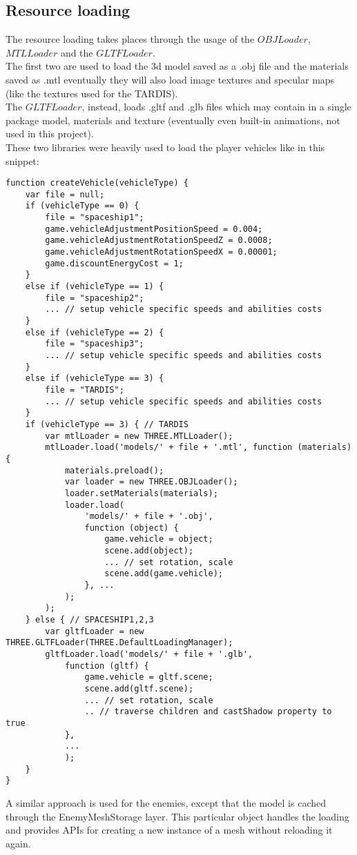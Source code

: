 \documentclass[a4paper,11pt]{article}
\begin{document}
\subsection{Resource loading}
The resource loading takes places through the usage of the $OBJLoader$, $MTLLoader$ and the $GLTFLoader$.\\
The first two are used to load the 3d model saved as a .obj file and the materials saved as .mtl eventually they will also load image textures and specular maps (like the textures used for the TARDIS).\\
The $GLTFLoader$, instead, loads .gltf and .glb files which may contain in a single package model, materials and texture (eventually even built-in animations, not used in this project).\\
These two libraries were heavily used to load  the player vehicles like in this snippet:
\begin{verbatim}
function createVehicle(vehicleType) {
    var file = null;
    if (vehicleType == 0) {
        file = "spaceship1";
        game.vehicleAdjustmentPositionSpeed = 0.004;
        game.vehicleAdjustmentRotationSpeedZ = 0.0008;
        game.vehicleAdjustmentRotationSpeedX = 0.00001;
        game.discountEnergyCost = 1;
    }
    else if (vehicleType == 1) {
        file = "spaceship2";
        ... // setup vehicle specific speeds and abilities costs
    }
    else if (vehicleType == 2) {
        file = "spaceship3";
        ... // setup vehicle specific speeds and abilities costs
    }
    else if (vehicleType == 3) {
        file = "TARDIS";
        ... // setup vehicle specific speeds and abilities costs
    }
    if (vehicleType == 3) { // TARDIS
        var mtlLoader = new THREE.MTLLoader();
        mtlLoader.load('models/' + file + '.mtl', function (materials) {
            materials.preload();
            var loader = new THREE.OBJLoader();
            loader.setMaterials(materials);
            loader.load(
                'models/' + file + '.obj',
                function (object) {
                    game.vehicle = object;
                    scene.add(object);
                    ... // set rotation, scale
                    scene.add(game.vehicle);
                }, ...
            );
        );
    } else { // SPACESHIP1,2,3
        var gltfLoader = new THREE.GLTFLoader(THREE.DefaultLoadingManager);
        gltfLoader.load('models/' + file + '.glb',
            function (gltf) {
                game.vehicle = gltf.scene;
                scene.add(gltf.scene);
                ... // set rotation, scale
                .. // traverse children and castShadow property to true
            },
            ...
            );
    }
}
\end{verbatim}
A similar approach is used for the enemies, except that the model is cached through the EnemyMeshStorage layer.
This particular object handles the loading and provides APIs for creating a new instance of a mesh without reloading it again.
\end{document}

